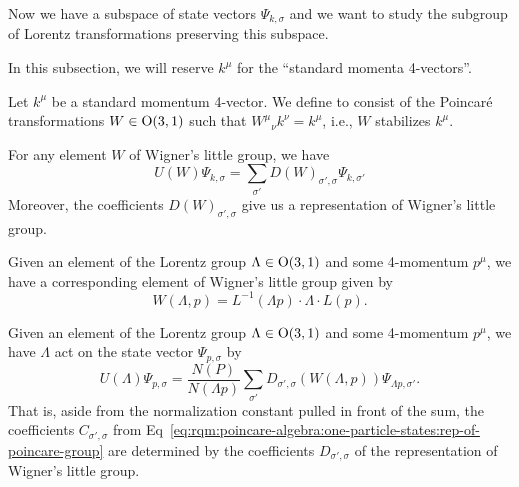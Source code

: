 Now we have a subspace of state vectors $\Psi_{k,\sigma}$ and we want to
study the subgroup of Lorentz transformations preserving this subspace.

In this subsection, we will reserve $k^{\mu}$ for the ``standard momenta 4-vectors''.

\begin{definition}
Let $k^{\mu}$ be a standard momentum 4-vector. We define
to consist of the Poincar\'e transformations
$W\in\mathrm{O}(3,1)$ such that ${W^{\mu}}_{\nu}k^{\nu}=k^{\mu}$, i.e., $W$
stabilizes $k^{\mu}$.
\end{definition}

\begin{theorem}
  For any element $W$ of Wigner's little group, we have
  \begin{equation}
U(W)\Psi_{k,\sigma} = \sum_{\sigma'}D(W)_{\sigma',\sigma}\Psi_{k,\sigma'}
  \end{equation}
  Moreover, the coefficients $D(W)_{\sigma',\sigma}$ give us a
  representation of Wigner's little group.
\end{theorem}

\begin{corollary}
Given an element of the Lorentz group $\Lambda\in\mathrm{O}(3,1)$ and some
4-momentum $p^{\mu}$, we have a corresponding element of Wigner's little
group given by
\begin{equation}
W(\Lambda,p) = L^{-1}(\Lambda p)\cdot\Lambda\cdot L(p).
\end{equation}
\end{corollary}

\begin{corollary}
Given an element of the Lorentz group $\Lambda\in\mathrm{O}(3,1)$ and some
4-momentum $p^{\mu}$, we have $\Lambda$ act on the state vector
$\Psi_{p,\sigma}$ by
\begin{equation}\label{eq:rqm:poincare-algebra:one-particle-states:action-of-lorentz-transformation-on-state}
U(\Lambda)\Psi_{p,\sigma} = \frac{N(P)}{N(\Lambda p)}\sum_{\sigma'}D_{\sigma',\sigma}(W(\Lambda, p))\Psi_{\Lambda p,\sigma'}.
\end{equation}
That is, aside from the normalization constant pulled in front of the
sum, the coefficients $C_{\sigma',\sigma}$ from Eq~\eqref{eq:rqm:poincare-algebra:one-particle-states:rep-of-poincare-group} are determined by the
coefficients $D_{\sigma',\sigma}$ of the representation of Wigner's
little group.
\end{corollary}

